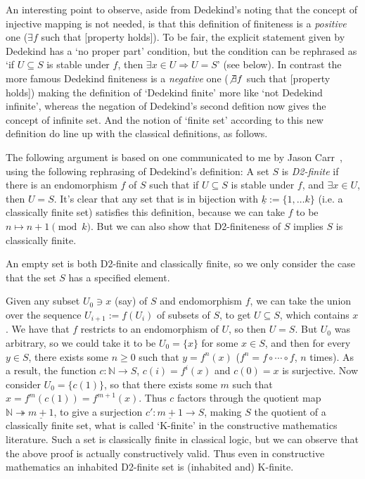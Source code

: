 \documentclass[leqno,hidelinks,10pt]{article}
\theoremstyle{definition}
\begin{document}
An interesting point to observe, aside from Dedekind's noting that the concept of injective mapping is not needed, is that this definition of finiteness is a \emph{positive} one ($\exists f$ such that [property holds]). 
To be fair, the explicit statement given by Dedekind has a `no proper part' condition, but the condition can be rephrased as `if $U\subseteq S$ is stable under $f$, then $\exists x\in U \Rightarrow U=S$' (see below).
In contrast the more famous Dedekind finiteness is a \emph{negative} one ($\not\exists f$ such that [property holds]) making the definition of `Dedekind finite' more like `not Dedekind infinite', whereas the negation of Dedekind's second defition now gives the concept of infinite set. 
And the notion of `finite set' according to this new definition do line up with the classical definitions, as follows.


The following argument is based on one communicated to me by Jason Carr~, using the following rephrasing of Dedekind's definition: A set $S$ is \emph{D2-finite} if there is an endomorphism $f$ of $S$ such that if $U\subseteq S$ is stable under $f$, and $\exists x \in U$, then $U=S$. 
It's clear that any set that is in bijection with $\underline{k}:=\{1,\ldots k\}$ (i.e. a classically finite set) satisfies this definition, because we can take $f$ to be $n\mapsto n+1\pmod{k}$. But we can also show that D2-finiteness of $S$ implies $S$ is classically finite.

An empty set is both D2-finite and classically finite, so we only consider the case that the set $S$ has a specified element.

Given any subset $U_0\ni x$ (say) of $S$ and endomorphism $f$, we can take the union over the sequence $U_{i+1}:=f(U_i)$ of subsets of $S$, to get $U\subseteq S$, which contains $x$. 
We have that $f$ restricts to an endomorphism of $U$, so then $U=S$. 
But $U_0$ was arbitrary, so we could take it to be $U_0=\{x\}$ for some $x\in S$, and then for every $y\in S$, there exists some $n \geq 0$ such that $y=f^n(x)$ ($f^n = f\circ \cdots \circ f$, $n$ times). 
As a result, the function $c\colon \mathbb{N}\to S$, $c(i) = f^i(x)$ and $c(0)=x$ is surjective.
Now consider $U_0 = \{c(1)\}$, so that there exists some $m$ such that $x=f^m(c(1)) = f^{m+1}(x)$.
Thus $c$ factors through the quotient map $\mathbb{N}\twoheadrightarrow \underline{m+1}$, to give a surjection $c'\colon \underline{m+1}\to S$, making $S$ the quotient of a classically finite set, what is called `K-finite' in the constructive mathematics literature. 
Such a set is classically finite in classical logic, but we can observe that the above proof is actually constructively valid. 
Thus even in constructive mathematics an inhabited D2-finite set is (inhabited and) K-finite.
\end{document}
